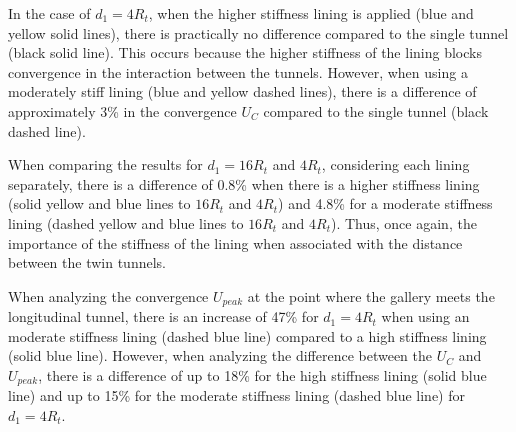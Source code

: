\documentclass[a4paper,fleqn]{cas-sc}
\begin{document}
In the case of $d_1=4R_t$, when the higher stiffness lining is applied (blue and yellow solid lines), there is practically no difference compared to the single tunnel (black solid line). This occurs because the higher stiffness of the lining blocks convergence in the interaction between the tunnels. However, when using a moderately stiff lining (blue and yellow dashed lines), there is a difference of approximately 3\% in the convergence $U_{C}$ compared to the single tunnel (black dashed line).

When comparing the results for $d_1 = 16R_t$ and $4R_t$, considering each lining separately, there is a difference of 0.8\% when there is a higher stiffness lining (solid yellow and blue lines to $16R_t$ and $4R_t$) and 4.8\% for a moderate stiffness lining (dashed yellow and blue lines to $16R_t$ and $4R_t$). Thus, once again, the importance of the stiffness of the lining when associated with the distance between the twin tunnels.

When analyzing the convergence $U_{peak}$ at the point where the gallery meets the longitudinal tunnel, there is an increase of 47\% for $d_1=4R_t$ when using an moderate stiffness lining (dashed blue line) compared to a high stiffness lining (solid blue line). However, when analyzing the difference between the $U_{C}$ and $U_{peak}$, there is a difference of up to 18\% for the high stiffness lining (solid blue line) and up to 15\% for the moderate stiffness lining (dashed blue line) for $d_1=4R_t$.
\end{document}
